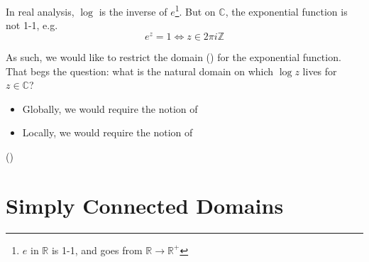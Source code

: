 \documentclass[11pt, oneside]{book}
\begin{document}
In real analysis, $\log$ is the inverse of $e$\footnote{$e$ in $\mathbb{R}$ is 1-1, and goes from $\mathbb{R} \to \mathbb{R}^+$}. But on $\mathbb{C}$, the exponential function is not 1-1, e.g.
\begin{equation*}
  e^z = 1 \iff z \in 2 \pi i \mathbb{Z}
\end{equation*}

As such, we would like to restrict the domain () for the exponential function. That begs the question: what is the natural domain on which $\log z$ lives for $z \in \mathbb{C}$?

\begin{itemize}
  \item Globally, we would require the notion of 
  \item Locally, we would require the notion of 
\end{itemize}

()


\section{Simply Connected Domains} %
\label{sec:simply_connected_domains}
\end{document}
